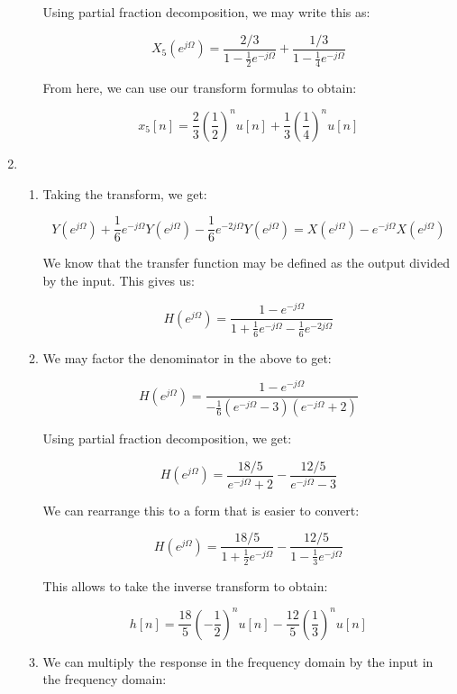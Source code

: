 \begin{enumerate}
\begin{enumerate}
        Using partial fraction decomposition, we may write this as:

        $$X_5(e^{j\Omega})=\frac{2/3}{1-\frac{1}{2}e^{-j\Omega}}+\frac{1/3}{1-\frac{1}{4}e^{-j\Omega}}$$

        From here, we can use our transform formulas to obtain:

        $$\boxed{x_5[n]=\frac{2}{3}\left( \frac{1}{2} \right)^{n}u[n]+\frac{1}{3}\left( \frac{1}{4} \right)^{n}u[n]}$$

    \end{enumerate}

  \item

    \begin{enumerate}

      \item Taking the transform, we get:

        $$Y(e^{j\Omega})+\frac{1}{6}e^{-j\Omega}Y(e^{j\Omega})-\frac{1}{6}e^{-2j\Omega}Y(e^{j\Omega})=X(e^{j\Omega})-e^{-j\Omega}X(e^{j\Omega})$$

        We know that the transfer function may be defined as the output divided by the input. This gives us:

        $$\boxed{H(e^{j\Omega})=\frac{1-e^{-j\Omega}}{1+\frac{1}{6}e^{-j\Omega}-\frac{1}{6}e^{-2j\Omega}}}$$

      \item We may factor the denominator in the above to get:

        $$H(e^{j\Omega})=\frac{1-e^{-j\Omega}}{-\frac{1}{6}(e^{-j\Omega}-3)(e^{-j\Omega}+2)}$$

        Using partial fraction decomposition, we get:

        $$H(e^{j\Omega})=\frac{18/5}{e^{-j\Omega}+2}-\frac{12/5}{e^{-j\Omega}-3}$$

        We can rearrange this to a form that is easier to convert:

        $$H(e^{j\Omega})=\frac{18/5}{1+\frac{1}{2}e^{-j\Omega}}-\frac{12/5}{1-\frac{1}{3}e^{-j\Omega}}$$

        This allows to take the inverse transform to obtain:

        $$\boxed{h[n]=\frac{18}{5}\left( -\frac{1}{2} \right)^nu[n]-\frac{12}{5}\left( \frac{1}{3} \right)^nu[n]}$$

      \item We can multiply the response in the frequency domain by the input in the frequency domain:


\end{enumerate}
\end{enumerate}

